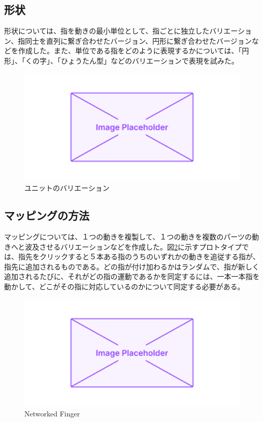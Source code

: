 \subsection*{形状}
形状については、指を動きの最小単位として、指ごとに独立したバリエーション、指同士を直列に繋ぎ合わせたバージョン、円形に繋ぎ合わせたバージョンなどを作成した。また、単位である指をどのように表現するかについては、「円形」、「くの字」、「ひょうたん型」などのバリエーションで表現を試みた。
\begin{figure}[H]
  \centering
  \includegraphics[width=15cm]{img/placeholder.png}
  \caption{ユニットのバリエーション}
  \label{fig:unit_valiation}
\end{figure}
\subsection*{マッピングの方法}
マッピングについては、１つの動きを複製して、１つの動きを複数のパーツの動きへと波及させるバリエーションなどを作成した。図\ref{fig:networked_finger}に示すプロトタイプでは、指先をクリックすると５本ある指のうちのいずれかの動きを追従する指が、指先に追加されるものである。どの指が付け加わるかはランダムで、指が新しく追加されるたびに、それがどの指の運動であるかを同定するには、一本一本指を動かして、どこがその指に対応しているのかについて同定する必要がある。
\begin{figure}[H]
  \centering
  \includegraphics[width=15cm]{img/placeholder.png}
  \caption{Networked Finger}
  \label{fig:networked_finger}
\end{figure}

